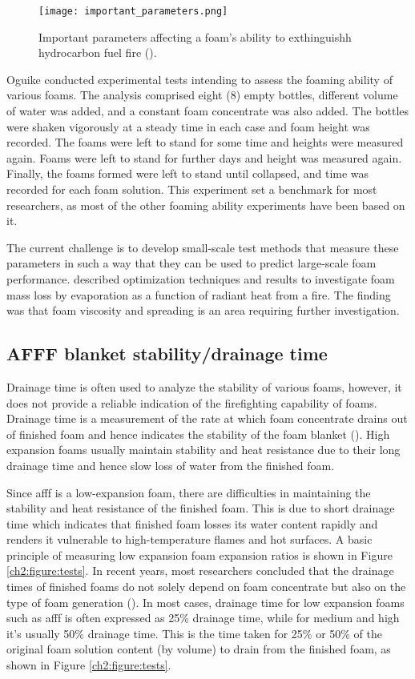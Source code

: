 \begin{figure}[H]
    \centering
    \texttt{[image: important\_parameters.png]}
    \caption{Important parameters affecting a foam's ability to exthinguishh hydrocarbon fuel fire (\cite{scheffey1995evaluating}).}
    \label{ch2:figure:parameters}
\end{figure}

Oguike \cite{oguike2013study} conducted experimental tests intending to assess the foaming ability of various foams. The analysis comprised eight (8) empty bottles, different volume of water was added, and a constant foam concentrate was also added. The bottles were shaken vigorously at a steady time in each case and foam height was recorded. The foams were left to stand for some time and heights were measured again. Foams were left to stand for further days and height was measured again. Finally, the foams formed were left to stand until collapsed, and time was recorded for each foam solution. This experiment set a benchmark for most researchers, as most of the other foaming ability experiments have been based on it. 

The current challenge is to develop small-scale test methods that measure these parameters in such a way that they can be used to predict large-scale foam performance. \cite{persson1992fire} described optimization techniques and results to investigate foam mass loss by evaporation as a function of radiant heat from a fire. The finding was that foam viscosity and spreading is an area requiring further investigation.

\subsection{AFFF blanket stability/drainage time}
Drainage time is often used to analyze the stability of various foams, however, it does not provide a reliable indication of the firefighting capability of foams. Drainage time is a measurement of the rate at which foam concentrate drains out of finished foam and hence indicates the stability of the foam blanket (\cite{aamodt2020review}). High expansion foams usually maintain stability and heat resistance due to their long drainage time and hence slow loss of water from the finished foam.  

Since \acrshort{afff} is a low-expansion foam, there are difficulties in maintaining the stability and heat resistance of the finished foam. This is due to short drainage time which indicates that finished foam losses its water content rapidly and renders it vulnerable to high-temperature flames and hot surfaces. A basic principle of measuring low expansion foam expansion ratios is shown in Figure \ref{ch2:figure:tests}. In recent years, most researchers concluded that the drainage times of finished foams do not solely depend on foam concentrate but also on the type of foam generation (\cite{martin2012fire}). In most cases, drainage time for low expansion foams such as \acrshort{afff} is often expressed as 25\% drainage time, while for medium and high it’s usually 50\% drainage time. This is the time taken for 25\% or 50\% of the original foam solution content (by volume) to drain from the finished foam, as shown in Figure \ref{ch2:figure:tests}.

